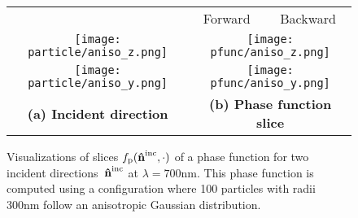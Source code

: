\begin{figure}[t]
    \centering
    \setlength{\resLen}{1in}
    \addtolength{\tabcolsep}{-3pt}
    \small
    \begin{tabular}{ccc}
        & Forward & Backward\\
        \texttt{[image: particle/aniso\_z.png]}
        & \multicolumn{2}{c}{\texttt{[image: pfunc/aniso\_z.png]}}
        \\
        \texttt{[image: particle/aniso\_y.png]}
        & \multicolumn{2}{c}{\texttt{[image: pfunc/aniso\_y.png]}}
        \\
        \textbf{(a) Incident direction} & \multicolumn{2}{c}{\textbf{(b) Phase function slice}}
    \end{tabular}
    \caption{\label{fig:aniso1}
        Visualizations of slices $f_\mathrm{p}(\mathbf{\hat{n}}^{\text{inc}},\cdot)$ of a phase function for two incident directions~$\mathbf{\hat{n}}^{\text{inc}}$ at $\lambda = 700\text{nm}$.
        This phase function is computed using a configuration where 100 particles with radii 300nm follow an anisotropic Gaussian distribution.
    }
\end{figure}
